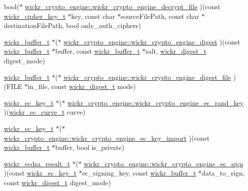 \begin{DoxyCompactItemize}
\item 
bool($\ast$ \mbox{\hyperlink{group__wickr__crypto__engine_ga361b843efc839e30f90ce24c15b1dd27}{wickr\+\_\+crypto\+\_\+engine\+::wickr\+\_\+crypto\+\_\+engine\+\_\+decrypt\+\_\+file}} )(const \mbox{\hyperlink{structwickr__cipher__key}{wickr\+\_\+cipher\+\_\+key\+\_\+t}} $\ast$key, const char $\ast$source\+File\+Path, const char $\ast$destination\+File\+Path, bool only\+\_\+auth\+\_\+ciphers)
\item 
\mbox{\hyperlink{structwickr__buffer}{wickr\+\_\+buffer\+\_\+t}} $\ast$($\ast$ \mbox{\hyperlink{group__wickr__crypto__engine_ga42dfc5b4df166616d962ee4c792ceaf4}{wickr\+\_\+crypto\+\_\+engine\+::wickr\+\_\+crypto\+\_\+engine\+\_\+digest}} )(const \mbox{\hyperlink{structwickr__buffer}{wickr\+\_\+buffer\+\_\+t}} $\ast$buffer, const \mbox{\hyperlink{structwickr__buffer}{wickr\+\_\+buffer\+\_\+t}} $\ast$salt, \mbox{\hyperlink{structwickr__digest}{wickr\+\_\+digest\+\_\+t}} digest\+\_\+mode)
\item 
\mbox{\hyperlink{structwickr__buffer}{wickr\+\_\+buffer\+\_\+t}} $\ast$($\ast$ \mbox{\hyperlink{group__wickr__crypto__engine_ga298d2dea6722151c11e04458d3924823}{wickr\+\_\+crypto\+\_\+engine\+::wickr\+\_\+crypto\+\_\+engine\+\_\+digest\+\_\+file}} )(F\+I\+LE $\ast$in\+\_\+file, const \mbox{\hyperlink{structwickr__digest}{wickr\+\_\+digest\+\_\+t}} mode)
\item 
\mbox{\hyperlink{structwickr__ec__key}{wickr\+\_\+ec\+\_\+key\+\_\+t}} $\ast$($\ast$ \mbox{\hyperlink{group__wickr__crypto__engine_gad16b229b7d16cf00d3983c277ee3b88b}{wickr\+\_\+crypto\+\_\+engine\+::wickr\+\_\+crypto\+\_\+engine\+\_\+ec\+\_\+rand\+\_\+key}} )(\mbox{\hyperlink{structwickr__ec__curve}{wickr\+\_\+ec\+\_\+curve\+\_\+t}} curve)
\item 
\mbox{\hyperlink{structwickr__ec__key}{wickr\+\_\+ec\+\_\+key\+\_\+t}} $\ast$($\ast$ \mbox{\hyperlink{group__wickr__crypto__engine_ga87a069bbd3cdf509946e4ca0ca008f8f}{wickr\+\_\+crypto\+\_\+engine\+::wickr\+\_\+crypto\+\_\+engine\+\_\+ec\+\_\+key\+\_\+import}} )(const \mbox{\hyperlink{structwickr__buffer}{wickr\+\_\+buffer\+\_\+t}} $\ast$buffer, bool is\+\_\+private)
\item 
\mbox{\hyperlink{structwickr__ecdsa__result}{wickr\+\_\+ecdsa\+\_\+result\+\_\+t}} $\ast$($\ast$ \mbox{\hyperlink{group__wickr__crypto__engine_gac5a36d2a53e06a75a2b818e6a5cc96a1}{wickr\+\_\+crypto\+\_\+engine\+::wickr\+\_\+crypto\+\_\+engine\+\_\+ec\+\_\+sign}} )(const \mbox{\hyperlink{structwickr__ec__key}{wickr\+\_\+ec\+\_\+key\+\_\+t}} $\ast$ec\+\_\+signing\+\_\+key, const \mbox{\hyperlink{structwickr__buffer}{wickr\+\_\+buffer\+\_\+t}} $\ast$data\+\_\+to\+\_\+sign, const \mbox{\hyperlink{structwickr__digest}{wickr\+\_\+digest\+\_\+t}} digest\+\_\+mode)

\end{DoxyCompactItemize}
